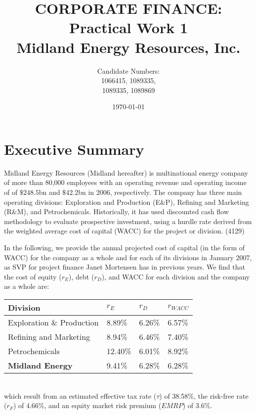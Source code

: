 \documentclass{article}
\title{CORPORATE FINANCE: \\Practical Work 1\\ Midland Energy Resources, Inc.}
\author{Candidate Numbers: \\1066415, 1089335, \\1089335, 1089869}
\date{\today}
\begin{document}
\maketitle

\newpage
\hrulefill
\section{Executive Summary}
Midland Energy Resources (Midland hereafter) is  multinational energy company of more than 80,000 employees with an operating revenue and operating income of of $\$248.5$bn and $\$42.2$bn in 2006, respectively. The company has three main operating divisions: Exploration and Production (E\&P), Refining and Marketing (R\&M), and Petrochemicals. Historically, it has used discounted cash flow methodology to evaluate prospective investment, using a hurdle rate derived from the weighted average cost of capital (WACC) for the project or division. (4129)

In the following, we provide the annual projected cost of capital (in the form of WACC) for the company as a whole and for each of its divisions in January 2007, as SVP for project finance Janet Mortensen has in previous years.
We find that the cost of equity ($r_E$), debt ($r_D$), and WACC for each division and the company as a whole are:
\begin{table}[h]
    \centering
    \begin{tabular}{llll}
    \textbf{Division}                  & $r_E$    & $r_D$   & $r_{W\!ACC}$ \\ \hline
    Exploration \& Production & 8.89\%  & 6.26\% & 6.57\%  \\
    Refining and Marketing    & 8.94\%  & 6.46\% & 7.40\%  \\
    Petrochemicals            & 12.40\% & 6.01\% & 8.92\%  \\ \hline
    \textbf{Midland Energy}   & 9.41\%  & 6.28\% & 6.28\% 
    \end{tabular}
\end{table}\\
which result from an estimated effective tax rate ($\tau$) of 38.58\%, the risk-free rate ($r_F$) of 4.66\%, and an equity market risk premium ($EMRP$) of 3.6\%.

\hrulefill
\end{document}
